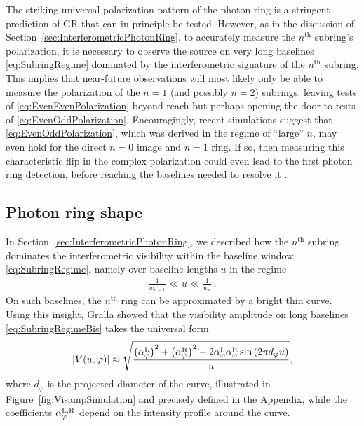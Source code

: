 \documentclass[graybox,envcountchap]{svmult}
\newcommand{\ab}[1]{\left|#1\right|}
\newcommand{\pa}[1]{\left(#1\right)}
\begin{document}
The striking universal polarization pattern of the photon ring is a stringent prediction of GR that can in principle be tested.
However, as in the discussion of Section~\ref{sec:InterferometricPhotonRing}, to accurately measure the $n^\text{th}$ subring's polarization, it is necessary to observe the source on very long baselines \eqref{eq:SubringRegime} dominated by the interferometric signature of the $n^\text{th}$ subring.
This implies that near-future observations will most likely only be able to measure the polarization of the $n=1$ (and possibly $n=2$) subrings, leaving tests of \eqref{eq:EvenEvenPolarization} beyond reach but perhaps opening the door to tests of \eqref{eq:EvenOddPolarization}.
Encouragingly, recent simulations \cite{Palumbo2022} suggest that \eqref{eq:EvenOddPolarization}, which was derived in the regime of ``large'' $n$, may even hold for the direct $n=0$ image and $n=1$ ring.
If so, then measuring this characteristic flip in the complex polarization could even lead to the first photon ring detection, before reaching the baselines needed to resolve it \cite{Palumbo2023}.

\subsection{Photon ring shape}
\label{sec:PhotonRingShape}

In Section~\ref{sec:InterferometricPhotonRing}, we described how the $n^\text{th}$ subring dominates the interferometric visibility within the baseline window \eqref{eq:SubringRegime}, namely over baseline lengths $u$ in the regime
\begin{align}
    \label{eq:SubringRegimeBis}
    \frac{1}{w_{n-1}}\ll u\ll\frac{1}{w_n}\,.
\end{align}
On such baselines, the $n^\text{th}$ ring can be approximated by a bright thin curve.
Using this insight, Gralla \cite{Gralla2020} showed that the visibility amplitude on long baselines \eqref{eq:SubringRegimeBis} takes the universal form
\begin{align}
    \label{eq:UniversalVisamp}
    \ab{V(u,\varphi)}\approx\sqrt{\frac{\pa{\alpha_\varphi^{\rm L}}^2+\pa{\alpha_\varphi^{\rm R}}^2+2\alpha_\varphi^{\rm L}\alpha_\varphi^{\rm R}\sin\pa{2\pi d_\varphi u}}{u}},
\end{align}
where $d_\varphi$ is the projected diameter of the curve, illustrated in Figure~\ref{fig:VisampSimulation} and precisely defined in the Appendix, while the coefficients $\alpha_\varphi^{\rm L,R}$ depend on the intensity profile around the curve.
\end{document}
